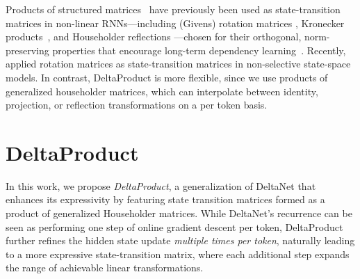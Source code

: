 \documentclass{article} %
\begin{document}
Products of structured matrices~\citep{kissel2023structured} have previously been used as state-transition matrices in non-linear RNNs—including (Givens) rotation matrices \citep{Dorobantu2016DizzyRNNRR, jing-icml17a, dangovski2019rotational}, Kronecker products~\citep{jose-icml18a}, and Householder reflections \citep{mhammedi-icml17a}—chosen for their orthogonal, norm-preserving properties that encourage long-term dependency learning~\citep{hochreiter1991untersuchungen, bengio1994learning}. Recently, \citet{biegun2024rotrnn} applied rotation matrices as state-transition matrices in non-selective state-space models. In contrast, DeltaProduct is more flexible, since we use products of generalized householder matrices, which can interpolate between identity, projection, or reflection transformations on a per token basis. 



\section{DeltaProduct}\label{sec:DeltaProduct}

\vspace{-3mm}
In this work, we propose \textit{DeltaProduct}, a generalization of DeltaNet that enhances its expressivity by featuring state transition matrices formed as a product of generalized Householder matrices. 
While DeltaNet's recurrence can be seen as performing one step of online gradient descent per token, DeltaProduct further refines the hidden state update \emph{multiple times per token}, naturally leading to a more expressive state-transition matrix, where each additional step expands the range of achievable linear transformations.
\end{document}
